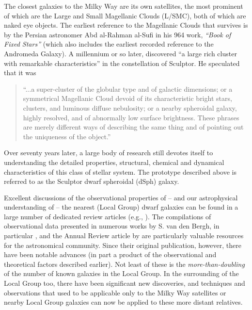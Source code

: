 \documentclass[manuscript]{aastex}
\begin{document}
The closest galaxies to the Milky Way are its own satellites, the
most prominent of which are the Large and Small Magellanic Clouds
(L/SMC), both of which are naked eye objects. The earliest reference
to the Magellanic Clouds that survives is by the Persian astronomer
Abd al-Rahman al-Sufi in his 964 work, {\it ``Book of Fixed Stars''}
(which also includes the earliest recorded reference to the Andromeda
Galaxy). A millennium or so later, \cite{shapley1938a} discovered ``a large rich
cluster with remarkable characteristics'' in the constellation of
Sculptor. He speculated that it was

\begin{quote}
``...a super-cluster of the globular type and of galactic dimensions;
or a symmetrical Magellanic Cloud devoid of its characteristic bright
stars, clusters, and luminous diffuse nebulosity; or a nearby
spheroidal galaxy, highly resolved, and of abnormally low surface
brightness. These phrases are merely different ways of describing the
same thing and of pointing out the uniqueness of the object.''
\end{quote}

\noindent Over seventy years later, a large body of research still
devotes itself to understanding the detailed properties, structural,
chemical and dynamical characteristics of this class of stellar
system. The prototype described above is referred to as the Sculptor
dwarf spheroidal (dSph) galaxy.

Excellent discussions of the observational properties of -- and our
astrophysical understanding of -- the nearest (Local Group) dwarf
galaxies can be found in a large number of dedicated review articles
(e.g.,
\citealt{gallagher1994,grebel1997,mateo1998a,vandenbergh2000,geisler2007,tolstoy2009}). The
compilations of observational data presented in numerous works by
S. van den Bergh, in particular \cite{vandenbergh2000}, and the Annual
Review article by \cite{mateo1998a} are particularly valuable
resources for the astronomical community. Since their original
publication, however, there have been notable advances (in part a
product of the observational and theoretical factors described
earlier). Not least of these is the {\it more-than-doubling} of the
number of known galaxies in the Local Group. In the surrounding of the
Local Group too, there have been significant new discoveries, and
techniques and observations that used to be applicable only to the
Milky Way satellites or nearby Local Group galaxies can now be applied
to these more distant relatives.
\end{document}
